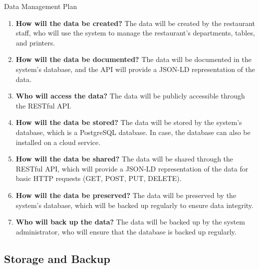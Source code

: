 \begin{frame}[allowframebreaks]{Data Management Plan}

	\begin{enumerate}\justifying
		\item \textbf{How will the data be \textcolor{UNITSCherry}{created}?} The data will be created by the
		      restaurant staff, who will use the system to manage the restaurant's
		      departments, tables, and printers.
		\item \textbf{How will the data be \textcolor{UNITSCherry}{documented}?} The data will be documented in
		      the system's database, and the API will provide a JSON-LD representation of
		      the data.
		\item \textbf{Who will \textcolor{UNITSCherry}{access} the data?} The data will be publicly accessible
		      through the RESTful API.
		\item \textbf{How will the data be \textcolor{UNITSCherry}{stored}?} The data will be stored by the
		      system's database, which is a PostgreSQL database. In case, the database
			  can also be installed on a cloud service.
		\item \textbf{How will the data be \textcolor{UNITSCherry}{shared}?} The data will be shared through the
		      RESTful API, which will provide a JSON-LD representation of the data for
			  basic HTTP requests (GET, POST, PUT, DELETE).
		\item \textbf{How will the data be \textcolor{UNITSCherry}{preserved}?} The data will be preserved by
		      the system's database, which will be backed up regularly to ensure data
			  integrity.
		\item \textbf{Who will \textcolor{UNITSCherry}{back up} the data?} The data will be backed up by the
		      system administrator, who will ensure that the database is backed up
			  regularly.
	\end{enumerate}
\end{frame}

\subsection{Storage and Backup}


